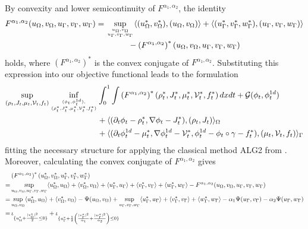 \documentclass{article}
\def\calG{{\mathcal G}} \def\calH{{\mathcal H}} \def\calI{{\mathcal I}}
\DeclarePairedDelimiter{\skp}{\langle}{\rangle}
\begin{document}
By convexity and lower semicontinuity of $F^{\alpha_1, \alpha_2}$, the identity 
\begin{align*}
    F^{\alpha_1, \alpha_2}(u_\Omega, v_\Omega, u_\Gamma,v_\Gamma, w_\Gamma) & = \sup\limits_{\genfrac{}{}{0pt}{}{u_\Omega, v_\Omega}{u_\Gamma,v_\Gamma, w_\Gamma}} \skp{(u^*_\Omega, v^*_\Omega), (u_\Omega, v_\Omega)} + \skp{(u^*_\Gamma, v^*_\Gamma, w^*_\Gamma), (u_\Gamma, v_\Gamma, w_\Gamma)} \\
    & \qquad \qquad - \left(F^{\alpha_1, \alpha_2}\right)^*(u_\Omega, v_\Omega, u_\Gamma,v_\Gamma, w_\Gamma)
\end{align*}
holds, where $ \left(F^{\alpha_1, \alpha_2}\right)^*$ is the convex conjugate of $F^{\alpha_1, \alpha_2}$. Substituting this expression into our objective functional leads to the formulation
\begin{align*}
    \sup\limits_{(\rho_t, J_t, \mu_t, \mathcal{V}_t, f_t)} \inf\limits_{\genfrac{}{}{0pt}{}{(\phi_t, \phi_t^{1d}),}{(\rho_t^*, J_t^*, \mu_t^*, \mathcal{V}_t^*, f_t^*)}} &\int_0^1 \int \left(F^{\alpha_1, \alpha_2}\right)^*(\rho_t^*, J_t^*, \mu_t^*, \mathcal{V}_t^*, f_t^*)  \, dx dt + \calG(\phi_t, \phi_t^{1d}) \\
    &+ \skp{(\partial_t\phi_t - \rho_t^*,\nabla\phi_t - J_t^*),(\rho_t, J_t)}_\Omega \\
    &+ \skp{(\partial_t\phi^{1d}_t - \mu_t^*, \nabla\phi_t^{1d} - \mathcal{V}_t^*, \phi_t^{1d}-\phi_t\circ\gamma - f_t^*),(\mu_t, \mathcal{V}_t, f_t)}_\Gamma 
\end{align*}
fitting the necessary structure for applying the classical method ALG2 from \cite{augmented_1983}. Moreover, calculating the convex conjugate of $F^{\alpha_1, \alpha_2}$ gives
\begin{align*}
    &\left(F^{\alpha_1, \alpha_2}\right)^*(u^*_\Omega, v^*_\Omega, u^*_\Gamma,v^*_\Gamma, w^*_\Gamma)\\
    =& \sup\limits_{u_\Omega, v_\Omega, u_\Gamma,v_\Gamma, w_\Gamma} \skp{u^*_\Omega, u_\Omega} + \skp{v^*_\Omega, v_\Omega} + \skp{u^*_\Gamma, u_\Gamma} + \skp{v^*_\Gamma, v_\Gamma} + \skp{w^*_\Gamma, w_\Gamma} - F^{\alpha_1, \alpha_2}(u_\Omega, v_\Omega, u_\Gamma,v_\Gamma, w_\Gamma)\\
    =& \sup\limits_{u_\Omega, v_\Omega} \skp{u^*_\Omega, u_\Omega} + \skp{v^*_\Omega, v_\Omega} - \Psi(u_\Omega, v_\Omega) + \sup\limits_{u_\Gamma,v_\Gamma, w_\Gamma} \skp{u^*_\Gamma, u_\Gamma} + \skp{v^*_\Gamma, v_\Gamma} + \skp{w^*_\Gamma, w_\Gamma} - \alpha_1 \Psi(u_\Gamma, v_\Gamma) - \alpha_2 \Psi(u_\Gamma, w_\Gamma)\\
    =& \, \iota_{\{u_\Omega^*+\frac{|v_\Omega^*|^2}{2}\leq 0\}} + \iota_{\{u_\Gamma^* + \frac{1}{2}\left( \frac{|v_\Gamma^*|^2}{\alpha_1} + \frac{|w_\Gamma^*|^2}{\alpha_2} \right)\leq 0\}}
\end{align*}
\end{document}

